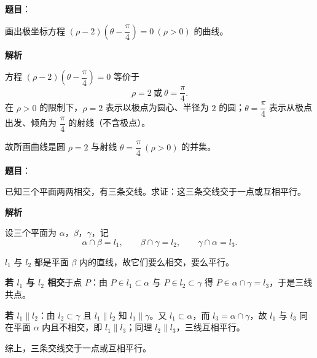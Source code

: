 \begin{answer}

\textbf{题目}：

画出极坐标方程 $(\rho-2)\left(\theta-\dfrac\pi4\right)=0\ (\rho>0)$ 的曲线。

\textbf{解析}

方程 $(\rho-2)\left(\theta-\dfrac\pi4\right)=0$ 等价于
\nopagebreak[4]
\[
\rho=2\ \text{或}\ \theta=\frac\pi4.
\]
在 $\rho>0$ 的限制下，$\rho=2$ 表示以极点为圆心、半径为 $2$ 的圆；$\theta=\dfrac\pi4$ 表示从极点出发、倾角为 $\dfrac\pi4$ 的射线（不含极点）。

故所画曲线是圆 $\rho=2$ 与射线 $\theta=\dfrac\pi4\ (\rho>0)$ 的并集。


\end{answer}
\begin{answer}

\textbf{题目}：

已知三个平面两两相交，有三条交线。求证：这三条交线交于一点或互相平行。

\textbf{解析}

设三个平面为 $\alpha$，$\beta$，$\gamma$，记
\nopagebreak[4]
\[
\alpha\cap\beta=l_1,\qquad \beta\cap\gamma=l_2,\qquad \gamma\cap\alpha=l_3.
\]

$l_1$ 与 $l_2$ 都是平面 $\beta$ 内的直线，故它们要么相交，要么平行。

\textbf{若 $l_1$ 与 $l_2$ 相交}于点 $P$：由 $P\in l_1\subset\alpha$ 与 $P\in l_2\subset\gamma$ 得 $P\in\alpha\cap\gamma=l_3$，于是三线共点。

\textbf{若 $l_1\parallel l_2$}：由 $l_2\subset\gamma$ 且 $l_1\parallel l_2$ 知 $l_1\parallel\gamma$。又 $l_1\subset\alpha$，而 $l_3=\alpha\cap\gamma$，故 $l_1$ 与 $l_3$ 同在平面 $\alpha$ 内且不相交，即 $l_1\parallel l_3$；同理 $l_2\parallel l_3$，三线互相平行。

综上，三条交线交于一点或互相平行。


\end{answer}
